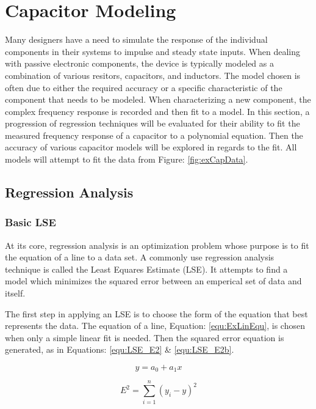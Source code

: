 \section {Capacitor Modeling}

Many designers have a need to simulate the response of the individual components in their systems to impulse and steady state inputs. When dealing with passive electronic components, the device is typically modeled as a combination of various resitors, capacitors, and inductors. The model chosen is often due to either the required accuracy or a specific characteristic of the component that needs to be modeled. When characterizing a new component, the complex frequency response is recorded and then fit to a model. In this section, a progression of regression techniques will be evaluated for their ability to fit the measured frequency response of a capacitor to a polynomial equation. Then the accuracy of various capacitor models will be explored in regards to the fit. All models will attempt to fit the data from Figure: \ref{fig:exCapData}.




\subsection{Regression Analysis}
\label{sec:RegressionAnalysis}
\subsubsection{Basic LSE}
At its core, regression analysis is an optimization problem whose purpose is to fit the equation of a line to a data set. A commonly use regression analysis technique is called the Least Equares Estimate (LSE). It attempts to find a model which minimizes the squared error between an emperical set of data and itself.

The first step in applying an LSE is to choose the form of the equation that best represents the data. The equation of a line, Equation: \eqref{equ:ExLinEqu}, is chosen when only a simple linear fit is needed.
Then the squared error equation is generated, as in Equations: \eqref{equ:LSE_E2} \& \eqref{equ:LSE_E2b}.

\begin{equation}
\label{equ:ExLinEqu}
y = a_0 + a_1 x
\end{equation}

\begin{equation}
\label{equ:LSE_E2}
E^2 = \sum_{i=1}^{n} (y_i - y)^2
\end{equation}

